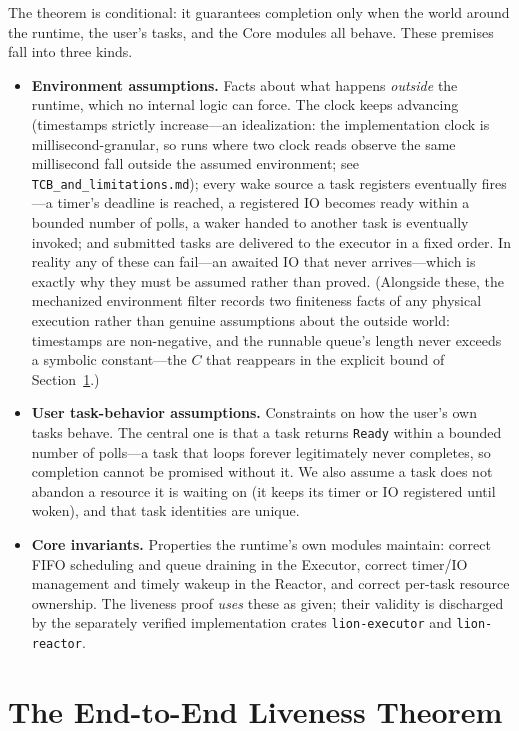 \documentclass[11pt]{article}
\theoremstyle{plain}
\theoremstyle{definition}
\begin{document}
The theorem is conditional: it guarantees completion only when the world around the
runtime, the user's tasks, and the Core modules all behave. These premises fall into three
kinds.

\begin{itemize}
\item \textbf{Environment assumptions.} Facts about what happens \emph{outside} the
runtime, which no internal logic can force. The clock keeps advancing (timestamps strictly
increase---an idealization: the implementation clock is millisecond-granular, so runs where
two clock reads observe the same millisecond fall outside the assumed environment; see
\texttt{TCB\_and\_limitations.md}); every wake source a task registers eventually fires---a timer's deadline is
reached, a registered IO becomes ready within a bounded number of polls, a waker handed to
another task is eventually invoked; and submitted tasks are delivered to the executor in a
fixed order. In reality any of these can fail---an awaited IO that never arrives---which is
exactly why they must be assumed rather than proved. (Alongside these, the mechanized
environment filter records two finiteness facts of any physical execution rather than
genuine assumptions about the outside world: timestamps are non-negative, and the runnable
queue's length never exceeds a symbolic constant---the $C$ that reappears in the explicit
bound of Section~\ref{sec:theorem}.)

\item \textbf{User task-behavior assumptions.} Constraints on how the user's own tasks
behave. The central one is that a task returns \texttt{Ready} within a bounded number of
polls---a task that loops forever legitimately never completes, so completion cannot be
promised without it. We also assume a task does not abandon a resource it is waiting on (it
keeps its timer or IO registered until woken), and that task identities are unique.

\item \textbf{Core invariants.} Properties the runtime's own modules maintain: correct FIFO
scheduling and queue draining in the Executor, correct timer/IO management and timely
wakeup in the Reactor, and correct per-task resource ownership. The liveness proof
\emph{uses} these as given; their validity is discharged by the separately verified
implementation crates \texttt{lion-executor} and \texttt{lion-reactor}.
\end{itemize}

\section{The End-to-End Liveness Theorem}
\label{sec:theorem}
\end{document}
